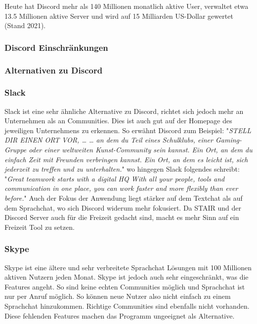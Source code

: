 \documentclass[a4paper, table]{article}
\begin{document}
Heute hat Discord mehr als 140 Millionen monatlich aktive User, verwaltet etwa 13.5 Millionen aktive Server und
wird auf 15 Milliarden US-Dollar gewertet (Stand 2021). \autocite{david_curry_discord_2022}

\subsubsection{Discord Einschr\"ankungen}\label{discord_einschraenkungen}


\subsubsection{Alternativen zu Discord}

\subsubsection*{Slack}

Slack ist eine sehr ähnliche Alternative zu Discord, richtet sich jedoch mehr an Unternehmen als an Communities.
Dies ist auch gut auf der Homepage des jeweiligen Unternehmens zu erkennen.
So erwähnt Discord zum Beispiel: "\textit{STELL DIR EINEN ORT VOR, …
… an dem du Teil eines Schulklubs, einer Gaming-Gruppe oder einer weltweiten Kunst-Community sein kannst. Ein Ort, an dem du einfach Zeit mit Freunden verbringen kannst. Ein Ort, an dem es leicht ist, sich jederzeit zu treffen und zu unterhalten.}" 
wo hingegen Slack folgendes schreibt: "\textit{Great teamwork starts with a digital HQ
With all your people, tools and communication in one place, you can work faster and more flexibly than ever before.}" 
Auch der Fokus der Anwendung liegt stärker auf dem Textchat als auf dem Sprachchat, wo sich Discord widerum mehr fokusiert.
Da STAIR und der Discord Server auch für die Freizeit gedacht sind, macht es mehr Sinn auf ein Freizeit Tool zu setzen.

\subsubsection*{Skype}
Skype ist eine ältere und sehr verbreitete Sprachchat Lösungen mit 100 Millionen aktiven Nutzern jeden Monat.
Skype ist jedoch auch sehr eingeschränkt, was die Features angeht.
So sind keine echten Communities möglich und Sprachchat ist nur per Anruf möglich.
So können neue Nutzer also nicht einfach zu einem Sprachchat hinzukommen.
Richtige Communities sind ebenfalls nicht vorhanden.
Diese fehlenden Features machen das Programm ungeeignet als Alternative.
\end{document}
